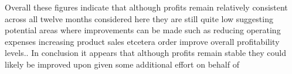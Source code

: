 Overall these figures indicate that although profits remain relatively consistent across all twelve months considered here they are still quite low suggesting potential areas where improvements can be made such as reducing operating expenses increasing product sales etcetera order improve overall profitability levels.. In conclusion it appears that although profits remain stable they could likely be improved upon given some additional effort on behalf of